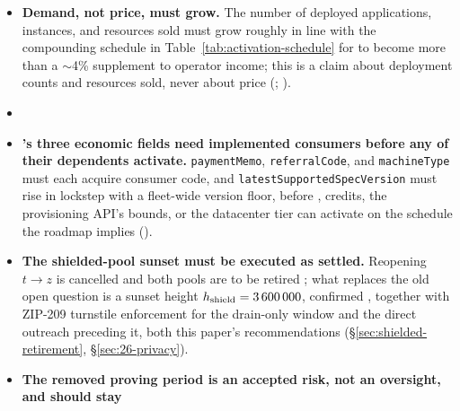 \begin{itemize}
\item \textbf{Demand, not price, must grow.} The number of deployed applications, instances, and
resources sold must grow roughly in line with the compounding schedule in
Table~\ref{tab:activation-schedule} for \PNR to become more than a $\sim$4\% supplement to operator
income; this is a claim about deployment counts and resources sold, never about price
(; ).
\item \textbf{} 
\item \textbf{'s three economic fields need implemented consumers before any of their
dependents activate.} \texttt{paymentMemo}, \texttt{referralCode}, and \texttt{machineType} must
each acquire consumer code, and \texttt{latest\allowbreak{}Supported\allowbreak{}Spec\allowbreak{}Version} must rise in lockstep with a
fleet-wide version floor, before \PNR,
credits, the provisioning API's bounds, or the datacenter tier can activate on the schedule the
roadmap implies ().
\item \textbf{The shielded-pool sunset must be executed as settled.} Reopening $t \to z$ is cancelled and
both pools are to be retired ; what replaces the old open
question is a sunset height $h_{\mathrm{shield}} = \num{3600000}$, confirmed
, together with ZIP-209 turnstile enforcement for the
drain-only window and the direct outreach preceding it, both this paper's recommendations
(\S\ref{sec:shielded-retirement}, \S\ref{sec:26-privacy}).
\item \textbf{The removed proving period is an accepted risk, not an oversight, and should stay
}
\end{itemize}
